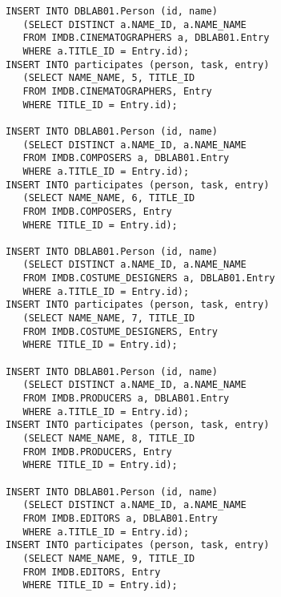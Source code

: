 \documentclass[11pt,a4paper,DIV=9]{scrartcl}
\begin{document}
\begin{lstlisting}
INSERT INTO DBLAB01.Person (id, name)
   (SELECT DISTINCT a.NAME_ID, a.NAME_NAME
   FROM IMDB.CINEMATOGRAPHERS a, DBLAB01.Entry
   WHERE a.TITLE_ID = Entry.id);
INSERT INTO participates (person, task, entry)
   (SELECT NAME_NAME, 5, TITLE_ID
   FROM IMDB.CINEMATOGRAPHERS, Entry
   WHERE TITLE_ID = Entry.id);

INSERT INTO DBLAB01.Person (id, name)
   (SELECT DISTINCT a.NAME_ID, a.NAME_NAME
   FROM IMDB.COMPOSERS a, DBLAB01.Entry
   WHERE a.TITLE_ID = Entry.id);
INSERT INTO participates (person, task, entry) 
   (SELECT NAME_NAME, 6, TITLE_ID
   FROM IMDB.COMPOSERS, Entry
   WHERE TITLE_ID = Entry.id);

INSERT INTO DBLAB01.Person (id, name)
   (SELECT DISTINCT a.NAME_ID, a.NAME_NAME
   FROM IMDB.COSTUME_DESIGNERS a, DBLAB01.Entry
   WHERE a.TITLE_ID = Entry.id);
INSERT INTO participates (person, task, entry)
   (SELECT NAME_NAME, 7, TITLE_ID
   FROM IMDB.COSTUME_DESIGNERS, Entry
   WHERE TITLE_ID = Entry.id);

INSERT INTO DBLAB01.Person (id, name)
   (SELECT DISTINCT a.NAME_ID, a.NAME_NAME
   FROM IMDB.PRODUCERS a, DBLAB01.Entry
   WHERE a.TITLE_ID = Entry.id);
INSERT INTO participates (person, task, entry)
   (SELECT NAME_NAME, 8, TITLE_ID
   FROM IMDB.PRODUCERS, Entry
   WHERE TITLE_ID = Entry.id);

INSERT INTO DBLAB01.Person (id, name)
   (SELECT DISTINCT a.NAME_ID, a.NAME_NAME
   FROM IMDB.EDITORS a, DBLAB01.Entry
   WHERE a.TITLE_ID = Entry.id);
INSERT INTO participates (person, task, entry)
   (SELECT NAME_NAME, 9, TITLE_ID
   FROM IMDB.EDITORS, Entry
   WHERE TITLE_ID = Entry.id);
\end{lstlisting}
\end{document}
